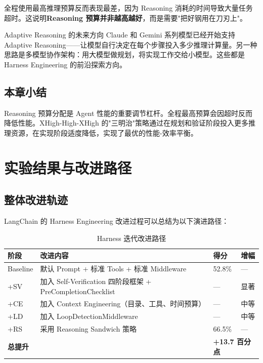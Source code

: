 \documentclass[a4paper]{article}
\begin{document}
全程使用最高推理预算反而表现最差，因为 Reasoning 消耗的时间导致大量任务超时。这说明\textbf{Reasoning 预算并非越高越好}，而是需要"把好钢用在刀刃上"。

\begin{knowledgebox}{Adaptive Reasoning 的未来方向}
Claude 和 Gemini 系列模型已经开始支持 Adaptive Reasoning——让模型自行决定在每个步骤投入多少推理计算量。另一种思路是多模型协作架构：用大模型做规划，将实现工作交给小模型。这些都是 Harness Engineering 的前沿探索方向。
\end{knowledgebox}

\subsection{本章小结}

Reasoning 预算分配是 Agent 性能的重要调节杠杆。全程最高预算会因超时反而降低性能。XHigh-High-XHigh 的"三明治"策略通过在规划和验证阶段投入更多推理资源，在实现阶段适度降低，实现了最优的性能-效率平衡。


\section{实验结果与改进路径}

\subsection{整体改进轨迹}

LangChain 的 Harness Engineering 改进过程可以总结为以下演进路径：

\begin{table}[H]
\centering
\caption{Harness 迭代改进路径}
\begin{tabular}{p{1.5cm}p{6cm}p{2cm}p{2.5cm}}
\toprule
\textbf{阶段} & \textbf{改进内容} & \textbf{得分} & \textbf{增幅} \\
\midrule
Baseline & 默认 Prompt + 标准 Tools + 标准 Middleware & 52.8\% & --- \\
+SV & 加入 Self-Verification 四阶段框架 + PreCompletionChecklist & --- & 显著 \\
+CE & 加入 Context Engineering（目录、工具、时间预算） & --- & 中等 \\
+LD & 加入 LoopDetectionMiddleware & --- & 中等 \\
+RS & 采用 Reasoning Sandwich 策略 & 66.5\% & --- \\
\midrule
\multicolumn{2}{l}{\textbf{总提升}} & \multicolumn{2}{l}{\textbf{+13.7 百分点}} \\
\bottomrule
\end{tabular}
\end{table}
\end{document}
